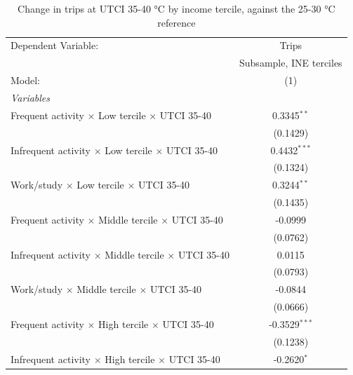 
\begin{table}[htbp]
   \caption{\label{table_model_d_35-40} Change in trips at UTCI 35-40 °C by income tercile, against the 25-30 °C reference}
   \centering
   \small
   \begin{tabular}{lc}
      \tabularnewline \midrule \midrule
      Dependent Variable:                                               & Trips\\  
                                                                        & Subsample, INE terciles \\   
      Model:                                                            & (1)\\  
      \midrule
      \emph{Variables}\\
      Frequent activity $\times$ Low tercile $\times$ UTCI 35-40        & 0.3345$^{**}$\\   
                                                                        & (0.1429)\\   
      Infrequent activity $\times$ Low tercile $\times$ UTCI 35-40      & 0.4432$^{***}$\\   
                                                                        & (0.1324)\\   
      Work/study $\times$ Low tercile $\times$ UTCI 35-40               & 0.3244$^{**}$\\   
                                                                        & (0.1435)\\   
      Frequent activity $\times$ Middle tercile $\times$ UTCI 35-40     & -0.0999\\   
                                                                        & (0.0762)\\   
      Infrequent activity $\times$ Middle tercile $\times$ UTCI 35-40   & 0.0115\\   
                                                                        & (0.0793)\\   
      Work/study $\times$ Middle tercile $\times$ UTCI 35-40            & -0.0844\\   
                                                                        & (0.0666)\\   
      Frequent activity $\times$ High tercile $\times$ UTCI 35-40       & -0.3529$^{***}$\\   
                                                                        & (0.1238)\\   
      Infrequent activity $\times$ High tercile $\times$ UTCI 35-40     & -0.2620$^{*}$\\   

\end{tabular}
\end{table}
